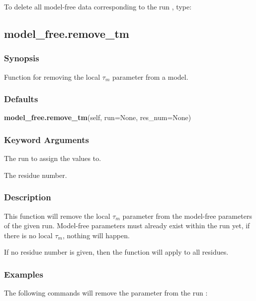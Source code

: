 To delete all model-free data corresponding to the run 
, type:




\newpage

\subsection{model\_free.remove\_tm}


\subsubsection{Synopsis}

Function for removing the local $\tau_m$ parameter from a model.

\subsubsection{Defaults}

\textsf{\textbf{model\_free.remove\_tm}(self, run=None, res\_num=None)}


\subsubsection{Keyword Arguments}


  The run to assign the values to.

  The residue number.

\subsubsection{Description}

This function will remove the local $\tau_m$ parameter from the model-free parameters of the given
run.  Model-free parameters must already exist within the run yet, if there is no local $\tau_m$,
nothing will happen.

If no residue number is given, then the function will apply to all residues.


\subsubsection{Examples}

The following commands will remove the parameter 
 from the run 
:


